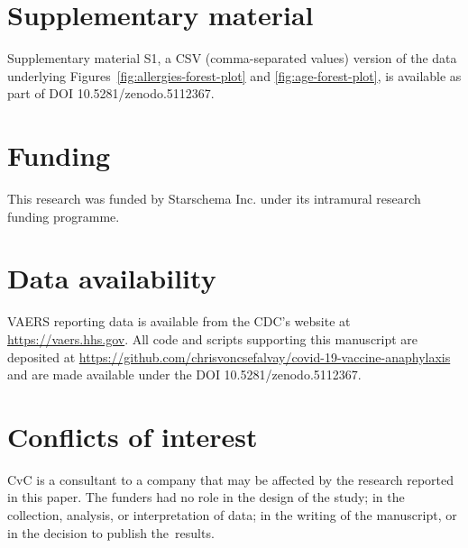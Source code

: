 \documentclass{article}
\begin{document}
\section*{Supplementary material}

Supplementary material S1, a CSV (comma-separated values) version of the data underlying Figures~\ref{fig:allergies-forest-plot} and \ref{fig:age-forest-plot}, is available as part of DOI 10.5281/zenodo.5112367.

\section*{Funding}

This research was funded by Starschema Inc. under its intramural research funding programme.

\section*{Data availability}

VAERS reporting data is available from the CDC's website at \url{https://vaers.hhs.gov}.
All code and scripts supporting this manuscript are deposited at
\url{https://github.com/chrisvoncsefalvay/covid-19-vaccine-anaphylaxis} and are made available under the DOI 10.5281/zenodo.5112367.

\section*{Conflicts of interest}

CvC is a consultant to a company that may be affected by the research reported in this paper.
The funders had no role in the design of the study;
in the collection, analysis, or interpretation of data;
in the writing of the manuscript, or in the decision to publish the~results.


\end{document}
